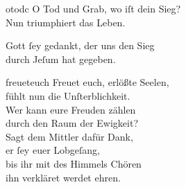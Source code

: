 \documentclass[shorttitlesize=55,tocstyle=ref-genre]{ees}
\begin{document}
{\begin{movement}{otodc}
  \voice[Tenore]
  O Tod und Grab, wo iſt dein Sieg?\\
  Nun triumphiert das Leben.

  \voice[Coro]
  Gott ſey gedankt, der uns den Sieg\\
  durch Jeſum hat gegeben.
\end{movement}

\begin{movement}{freueteuch}
  \voice[Coro]
  Freuet euch, erlößte Seelen,\\
  fühlt nun die Unſterblichkeit.\\
  Wer kann eure Freuden zählen\\
  durch den Raum der Ewigkeit?\\
  Sagt dem Mittler dafür Dank,\\
  er ſey euer Lobgeſang,\\
  bis ihr mit des Himmels Chören\\
  ihn verkläret werdet ehren.
\end{movement}
}

\eesScore
\end{document}
